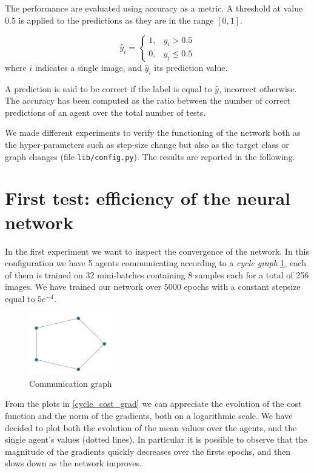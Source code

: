 \documentclass[a4paper,11pt,oneside]{book}
\begin{document}
\bigskip
The performance are evaluated using accuracy as a metric. A threshold at value 0.5 is applied to the predictions as they are in the range $[0, 1]$.

\begin{equation}
\hat{y}_i = 
\begin{cases}
1, & \hat{y}_i > 0.5 \\
0, & \hat{y}_i \le 0.5
\end{cases}
\end{equation}
where $i$ indicates a single image, and $\hat{y}_i$ its prediction value.

\bigskip
A prediction is said to be correct if the label is equal to $\hat{y}$, incorrect otherwise.
The accuracy has been computed as the ratio between the number of correct predictions of an agent over the total number of tests.

\bigskip
We made different experiments to verify the functioning of the network both as the hyper-parameters such as step-size change but also as the target class or graph changes (file \texttt{lib/config.py}). The results are reported in the following.

\newpage
\section{First test: efficiency of the neural network}
In the first experiment we want to inspect the convergence of the network. In this configuration we have 5 agents communicating according to a \textit{cycle graph} \ref{cycle_graph}, each of them is trained on 32 mini-batches containing 8 samples each for a total of 256 images. 
We have trained our network over $5000$ epochs with a constant stepsize equal to $5e^{-4}$.

\begin{figure}[h]
    \centering
    \includegraphics[width=0.32\textwidth]{cycle/graph}
    \caption{Communication graph}
    \label{cycle_graph}
\end{figure}

From the plots in \ref{cycle_cost_grad} we can appreciate the evolution of the cost function and the norm of the gradients, both on a logarithmic scale. We have decided to plot both the evolution of the mean values over the agents, and the single agent's values (dotted lines). In particular it is possible to observe that the magnitude of the gradients quickly decreases over the firsts epochs, and then slows down as the network improves.
\end{document}
